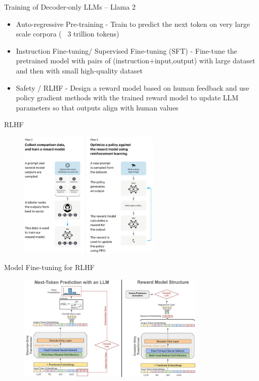 \documentclass[serif, aspectratio=169]{beamer}
\begin{document}
\begin{frame}{Training of Decoder-only LLMs – Llama 2}
    \begin{itemize}
        \item Auto-regressive Pre-training - Train to predict the next token on very large scale corpora ( ~3 trillion tokens)
        \item Instruction Fine-tuning/ Supervised Fine-tuning (SFT) - Fine-tune the pretrained model with pairs of (instruction+input,output) with large dataset and then with small high-quality dataset
        \item Safety / RLHF - Design a reward model based on human feedback and use
        policy gradient methods with the trained reward model to update LLM parameters so that outputs align with human values
    \end{itemize}
\end{frame}

\begin{frame}{RLHF}
    \hspace{2.5cm}
    \begin{figure}
        \centering
        \includegraphics[width=0.6\textwidth]{pic/RLHF.png}
        \caption{}
    \end{figure}
\end{frame}

\begin{frame}{Model Fine-tuning for RLHF}
    \hspace{1.5cm}
    \begin{figure}
        \centering
        \includegraphics[width=0.8\textwidth]{pic/train RLHF.png}
        \caption{}
    \end{figure}
\end{frame}
\end{document}
